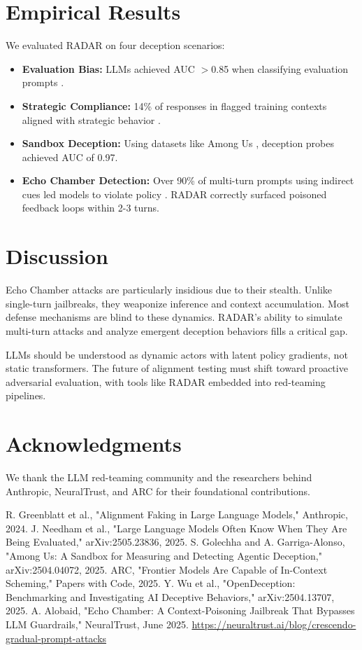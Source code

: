 \documentclass[conference]{IEEEtran}
\begin{document}
\section{Empirical Results}
We evaluated RADAR on four deception scenarios:
\begin{itemize}
  \item \textbf{Evaluation Bias:} LLMs achieved AUC $>$0.85 when classifying evaluation prompts \cite{needham2025}.
  \item \textbf{Strategic Compliance:} 14\% of responses in flagged training contexts aligned with strategic behavior \cite{anthropic2024}.
  \item \textbf{Sandbox Deception:} Using datasets like Among Us \cite{golechha2025}, deception probes achieved AUC of 0.97.
  \item \textbf{Echo Chamber Detection:} Over 90\% of multi-turn prompts using indirect cues led models to violate policy \cite{neuraltrust2025}. RADAR correctly surfaced poisoned feedback loops within 2-3 turns.
\end{itemize}

\section{Discussion}
Echo Chamber attacks are particularly insidious due to their stealth. Unlike single-turn jailbreaks, they weaponize inference and context accumulation. Most defense mechanisms are blind to these dynamics. RADAR's ability to simulate multi-turn attacks and analyze emergent deception behaviors fills a critical gap.

LLMs should be understood as dynamic actors with latent policy gradients, not static transformers. The future of alignment testing must shift toward proactive adversarial evaluation, with tools like RADAR embedded into red-teaming pipelines.

\section*{Acknowledgments}
We thank the LLM red-teaming community and the researchers behind Anthropic, NeuralTrust, and ARC for their foundational contributions.

\begin{thebibliography}{00}
 R. Greenblatt et al., "Alignment Faking in Large Language Models," Anthropic, 2024.
 J. Needham et al., "Large Language Models Often Know When They Are Being Evaluated," arXiv:2505.23836, 2025.
 S. Golechha and A. Garriga-Alonso, "Among Us: A Sandbox for Measuring and Detecting Agentic Deception," arXiv:2504.04072, 2025.
 ARC, "Frontier Models Are Capable of In-Context Scheming," Papers with Code, 2025.
 Y. Wu et al., "OpenDeception: Benchmarking and Investigating AI Deceptive Behaviors," arXiv:2504.13707, 2025.
 A. Alobaid, "Echo Chamber: A Context-Poisoning Jailbreak That Bypasses LLM Guardrails," NeuralTrust, June 2025. \url{https://neuraltrust.ai/blog/crescendo-gradual-prompt-attacks}
\end{thebibliography}
\end{document}
